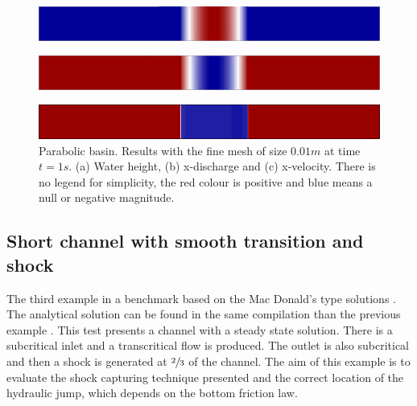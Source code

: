 \documentclass[a4paper,12pt]{article}
\begin{document}
\begin{figure}[H]
    \begin{subfigure}{.05\textwidth}
        \caption{}
    \end{subfigure}
    \begin{minipage}[c]{.94\textwidth}
        \includegraphics[width=\textwidth]{img/par/height_1.0.png}
    \end{minipage}
\par\medskip
    \begin{subfigure}{.05\textwidth}
        \caption{}
    \end{subfigure}
    \begin{minipage}[c]{.94\textwidth}
        \includegraphics[width=\textwidth]{img/par/momentum_1.0.png}
    \end{minipage}
\par\medskip
    \begin{subfigure}{.05\textwidth}
        \caption{}
    \end{subfigure}
    \begin{minipage}[c]{.94\textwidth}
        \includegraphics[width=\textwidth]{img/par/velocity_1.0.png}
    \end{minipage}
\caption{Parabolic basin. Results with the fine mesh of size $0.01m$ at time $t=1s$. (a) Water height, (b) x-discharge and (c) x-velocity. There is no legend for simplicity, the red colour is positive and blue means a null or negative magnitude.}
\label{parabola_results}
\end{figure}



\subsection{Short channel with smooth transition and shock}

The third example in a benchmark based on the Mac Donald's type solutions \cite{macdonald1997}. The analytical solution can be found in the same compilation than the previous example \cite{delestre2013}. This test presents a channel with a steady state solution. There is a subcritical inlet and a transcritical flow is produced. The outlet is also subcritical and then a shock is generated at $\sfrac{2}{3}$ of the channel. The aim of this example is to evaluate the shock capturing technique presented and the correct location of the hydraulic jump, which depends on the bottom friction law.
\end{document}
